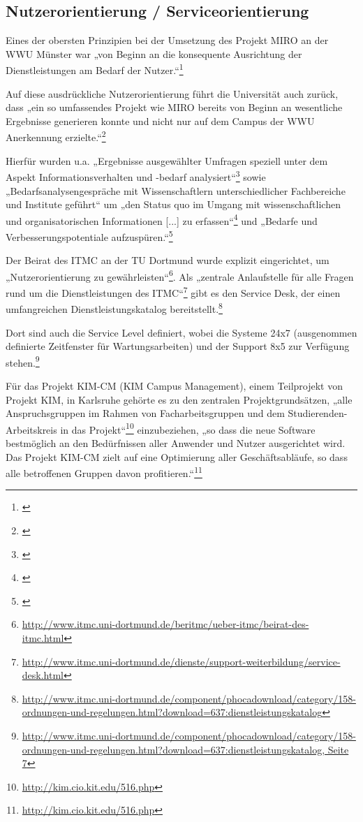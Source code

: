 \subsection{Nutzerorientierung / Serviceorientierung}
Eines der obersten Prinzipien bei der Umsetzung des Projekt MIRO an der WWU Münster war „von Beginn an die konsequente Ausrichtung der Dienstleistungen am Bedarf der Nutzer.“\footnote{\cite[19]{vogl_bericht_2013}}

Auf diese ausdrückliche Nutzerorientierung führt die Universität auch zurück, dass „ein so umfassendes Projekt wie MIRO bereits von Beginn an wesentliche Ergebnisse generieren konnte und nicht nur auf dem Campus der WWU Anerkennung erzielte.“\footnote{\cite[19]{vogl_bericht_2013}}

Hierfür wurden u.a. „Ergebnisse ausgewählter Umfragen speziell unter dem Aspekt Informationsverhalten und -bedarf analysiert“\footnote{\cite[19]{vogl_bericht_2013}} sowie „Bedarfsanalysengespräche mit Wissenschaftlern unterschiedlicher Fachbereiche und Institute geführt“ um „den Status quo im Umgang mit wissenschaftlichen und organisatorischen Informationen [...] zu erfassen“\footnote{\cite[19]{vogl_bericht_2013}} und „Bedarfe und Verbesserungspotentiale aufzuspüren.“\footnote{\cite[20]{vogl_bericht_2013}}

Der Beirat des ITMC an der TU Dortmund wurde explizit eingerichtet, um „Nutzerorientierung zu gewährleisten“\footnote{\url{http://www.itmc.uni-dortmund.de/beritmc/ueber-itmc/beirat-des-itmc.html}}. Als „zentrale Anlaufstelle für alle Fragen rund um die Dienstleistungen des ITMC“\footnote{\url{http://www.itmc.uni-dortmund.de/dienste/support-weiterbildung/service-desk.html}} gibt es den Service Desk, der einen umfangreichen Dienstleistungskatalog bereitstellt.\footnote{\url{http://www.itmc.uni-dortmund.de/component/phocadownload/category/158-ordnungen-und-regelungen.html?download=637:dienstleistungskatalog}}

Dort sind auch die Service Level definiert, wobei  die Systeme 24x7 (ausgenommen definierte Zeitfenster für Wartungsarbeiten) und der Support 8x5 zur Verfügung stehen.\footnote{\url{http://www.itmc.uni-dortmund.de/component/phocadownload/category/158-ordnungen-und-regelungen.html?download=637:dienstleistungskatalog, Seite 7}}

Für das Projekt KIM-CM (KIM Campus Management), einem Teilprojekt von Projekt KIM, in Karlsruhe gehörte es zu den zentralen Projektgrundsätzen, „alle Anspruchsgruppen im Rahmen von Facharbeitsgruppen und dem Studierenden-Arbeitskreis in das Projekt“\footnote{\url{http://kim.cio.kit.edu/516.php}} einzubeziehen, „so dass die neue Software bestmöglich an den Bedürfnissen aller Anwender und Nutzer ausgerichtet wird. Das Projekt KIM-CM zielt auf eine Optimierung aller Geschäftsabläufe, so dass alle betroffenen Gruppen davon profitieren.“\footnote{\url{http://kim.cio.kit.edu/516.php}}

